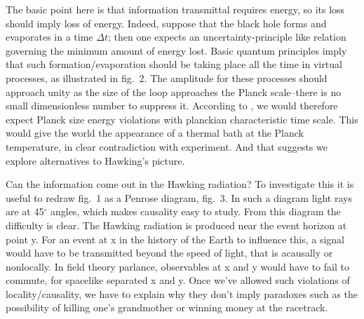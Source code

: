 The basic point here is that information transmittal requires energy, so
its loss should imply loss of energy. Indeed, suppose that the black
hole forms and evaporates in a time ${\Delta}{t}$; then one expects an
uncertainty-principle like relation
%
\eqn{}
%
governing the minimum amount of energy lost. Basic quantum principles imply that such
formation/evaporation should be taking place all the time in virtual
processes, as illustrated in fig.~2. The amplitude for these processes
should approach unity as the size of the loop approaches the Planck
scale--there is no small dimensionless number to suppress it. According
to \eninfo, we would therefore expect Planck size energy violations
with planckian characteristic time scale. This would give the world the
appearance of a thermal bath at the Planck temperature, in clear
contradiction with experiment. And that suggests we explore
alternatives to Hawking's picture.


Can the information come out in the Hawking radiation? To investigate
this it is useful to redraw fig.~1 as a Penrose diagram, fig.~3. In such
a diagram light rays are at 45$^\circ$ angles, which makes causality
easy to study. From this diagram the difficulty is clear. The Hawking
radiation is produced near the event horizon at point y. For an event at
x in the history of the Earth to influence this, a signal would have to
be transmitted beyond the speed of light, that is acausally or
nonlocally. In field theory parlance, observables at x and y would have
to fail to commute,
%
\eqn{}
%
for spacelike separated x and y. Once we've allowed such violations of
locality/causality, we have to explain why they don't imply
paradoxes such as the possibility of
killing one's grandmother or winning money at the
racetrack.

